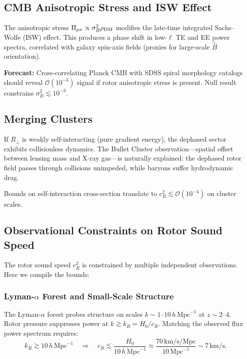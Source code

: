 \documentclass[11pt,a4paper]{article}
\numberwithin{equation}{section}
\theoremstyle{plain}
\theoremstyle{definition}
\theoremstyle{remark}
\begin{document}
\subsection{CMB Anisotropic Stress and ISW Effect}

The anisotropic stress $\Pi_{\mu\nu}\propto\sigma_B^2 \rho_{\rm DM}$ modifies the late-time integrated Sachs--Wolfe (ISW) effect. This produces a phase shift in low-$\ell$ TE and EE power spectra, correlated with galaxy spin-axis fields (proxies for large-scale $\hat B$ orientation).

\textbf{Forecast:} Cross-correlating Planck CMB with SDSS spiral morphology catalogs should reveal $\mathcal{O}(10^{-3})$ signal if rotor anisotropic stress is present. Null result constrains $\sigma_B^2\lesssim 10^{-3}$.

\subsection{Merging Clusters}

If $R_\perp$ is weakly self-interacting (pure gradient energy), the dephased sector exhibits collisionless dynamics. The Bullet Cluster observation---spatial offset between lensing mass and X-ray gas---is naturally explained: the dephased rotor field passes through collisions unimpeded, while baryons suffer hydrodynamic drag.

Bounds on self-interaction cross-section translate to $c_R^2\lesssim \mathcal{O}(10^{-4})$ on cluster scales.

\subsection{Observational Constraints on Rotor Sound Speed}

The rotor sound speed $c_R^2$ is constrained by multiple independent observations. Here we compile the bounds:

\subsubsection{Lyman-$\alpha$ Forest and Small-Scale Structure}

The Lyman-$\alpha$ forest probes structure on scales $k \sim 1$--$10\,h\,\text{Mpc}^{-1}$ at $z\sim 2$--$4$. Rotor pressure suppresses power at $k \gtrsim k_R = H_0/c_R$. Matching the observed flux power spectrum requires:
\begin{equation}
k_R \gtrsim 10\,h\,\text{Mpc}^{-1} \quad\Rightarrow\quad c_R \lesssim \frac{H_0}{10\,h\,\text{Mpc}^{-1}} \approx \frac{70\,\text{km/s/Mpc}}{10\,\text{Mpc}^{-1}} \sim 7\,\text{km/s}.
\end{equation}
\end{document}
